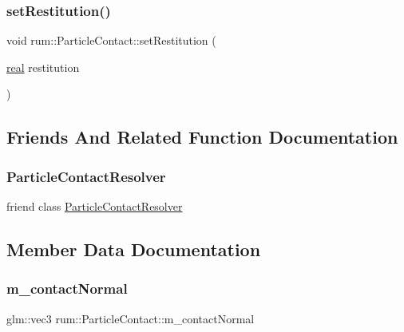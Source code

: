 \subsubsection{\texorpdfstring{set\+Restitution()}{setRestitution()}}
{\footnotesize\ttfamily void rum\+::\+Particle\+Contact\+::set\+Restitution (\begin{DoxyParamCaption}\item[{\hyperlink{namespacerum_a7e8cca23573d5eaead0f138cbaa4862c}{real}}]{restitution }\end{DoxyParamCaption})}



\subsection{Friends And Related Function Documentation}
\mbox{\label{classrum_1_1_particle_contact_ab2e3f4c3dc9b46966c6ec90e0fe88b6c}} 
\subsubsection{\texorpdfstring{Particle\+Contact\+Resolver}{ParticleContactResolver}}
{\footnotesize\ttfamily friend class \hyperlink{classrum_1_1_particle_contact_resolver}{Particle\+Contact\+Resolver}\hspace{0.3cm}{\ttfamily [friend]}}



\subsection{Member Data Documentation}
\mbox{\label{classrum_1_1_particle_contact_a8b0d26e0c773a739f34eb27d7e8d9c17}} 
\subsubsection{\texorpdfstring{m\+\_\+contact\+Normal}{m\_contactNormal}}
{\footnotesize\ttfamily glm\+::vec3 rum\+::\+Particle\+Contact\+::m\+\_\+contact\+Normal}

